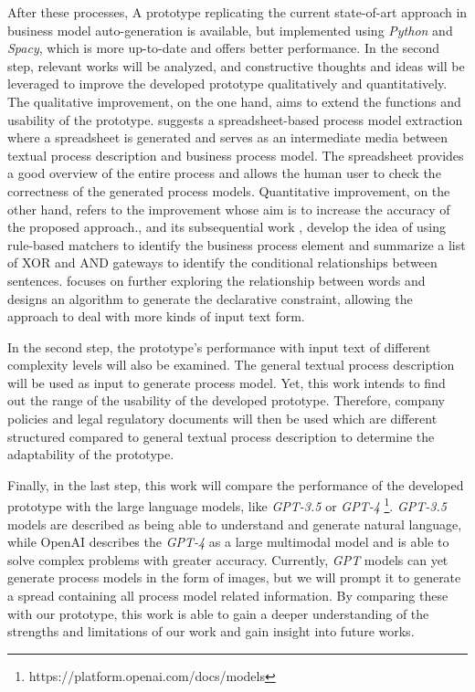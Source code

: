 After these processes, A prototype replicating the current state-of-art approach in business model auto-generation is available, but implemented using \textit{Python} and \textit{Spacy}, which is more up-to-date and offers better performance. In the second step, relevant works will be analyzed, and constructive thoughts and ideas will be leveraged to improve the developed prototype qualitatively and quantitatively. The qualitative improvement, on the one hand, aims to extend the functions and usability of the prototype. \cite{t2m_6} suggests a spreadsheet-based process model extraction where a spreadsheet is generated and serves as an intermediate media between textual process description and business process model. The spreadsheet provides a good overview of the entire process and allows the human user to check the correctness of the generated process models. Quantitative improvement, on the other hand, refers to the improvement whose aim is to increase the accuracy of the proposed approach.\cite{t2m_5}, and its subsequential work \cite{complement_1}, develop the idea of using rule-based matchers to identify the business process element and summarize a list of XOR and AND gateways to identify the conditional relationships between sentences. \cite{t2m_2} focuses on further exploring the relationship between words and designs an algorithm to generate the declarative constraint, allowing the approach to deal with more kinds of input text form.

In the second step, the prototype's performance with input text of different complexity levels will also be examined. The general textual process description will be used as input to generate process model. Yet, this work intends to find out the range of the usability of the developed prototype. Therefore, company policies and legal regulatory documents will then be used which are different structured compared to general textual process description to determine the adaptability of the prototype.


Finally, in the last step, this work will compare the performance of the developed prototype with the large language models, like \textit{GPT-3.5} or \textit{GPT-4} \footnote{https://platform.openai.com/docs/models}. \textit{GPT-3.5} models are described as being able to understand and generate natural language, while OpenAI describes the \textit{GPT-4} as a large multimodal model and is able to solve complex problems with greater accuracy. Currently, \textit{GPT} models can yet generate process models in the form of images, but we will prompt it to generate a spread containing all process model related information. By comparing these with our prototype, this work is able to gain a deeper understanding of the strengths and limitations of our work and gain insight into future works.


